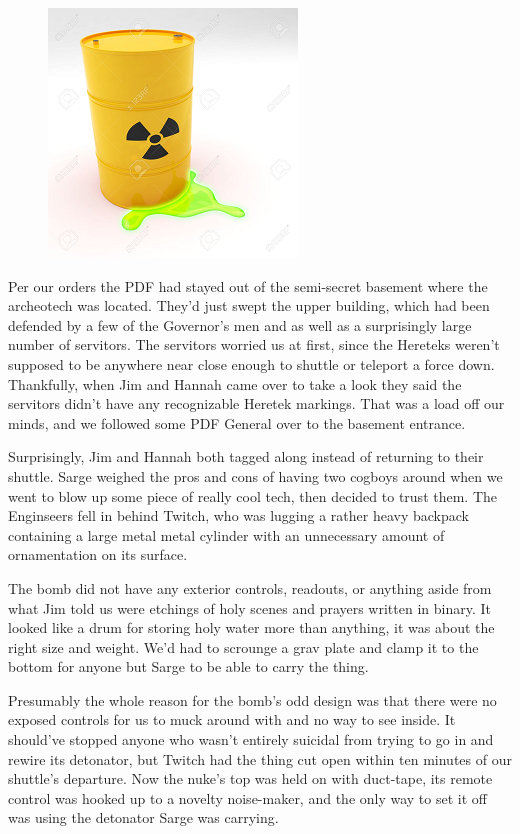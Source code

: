 \begin{figure}
	\begin{center}
		\includegraphics[width=\figwidth]{pics/11/75.png}
	\end{center}
\end{figure}
Per our orders the PDF had stayed out of the semi-secret basement where the archeotech was located. 
They'd just swept the upper building, which had been defended by a few of the Governor's men and as well as a surprisingly large number of servitors. 
The servitors worried us at first, since the Hereteks weren't supposed to be anywhere near close enough to shuttle or teleport a force down. 
Thankfully, when Jim and Hannah came over to take a look they said the servitors didn't have any recognizable Heretek markings. 
That was a load off our minds, and we followed some PDF General over to the basement entrance. 


Surprisingly, Jim and Hannah both tagged along instead of returning to their shuttle. 
Sarge weighed the pros and cons of having two cogboys around when we went to blow up some piece of really cool tech, then decided to trust them. 
The Enginseers fell in behind Twitch, who was lugging a rather heavy backpack containing a large metal metal cylinder with an unnecessary amount of ornamentation on its surface. 


The bomb did not have any exterior controls, readouts, or anything aside from what Jim told us were etchings of holy scenes and prayers written in binary. 
It looked like a drum for storing holy water more than anything, it was about the right size and weight. 
We'd had to scrounge a grav plate and clamp it to the bottom for anyone but Sarge to be able to carry the thing. 


Presumably the whole reason for the bomb's odd design was that there were no exposed controls for us to muck around with and no way to see inside. 
It should've stopped anyone who wasn't entirely suicidal from trying to go in and rewire its detonator, but Twitch had the thing cut open within ten minutes of our shuttle's departure. 
Now the nuke's top was held on with duct-tape, its remote control was hooked up to a novelty noise-maker, and the only way to set it off was using the detonator Sarge was carrying.

